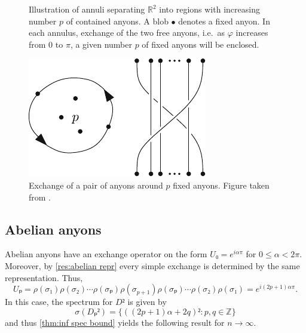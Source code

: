 \begin{figure}[h]
  \centering
  \caption{Illustration of annuli separating $ℝ^2$ into regions with increasing number $p$ of contained anyons. A blob $\bullet$ denotes a fixed anyon. In each annulus, exchange of the two free anyons, i.e.\ as $φ$ increases from $0$ to $π$, a given number $p$ of fixed anyons will be enclosed.}
  \label{fig:annuli}
\end{figure}

\begin{figure}[h]
  \centering
  \includegraphics{img/interchange_loop_p.pdf}
  \caption{Exchange of a pair of anyons around $p$ fixed anyons. Figure taken from \cite{lundholm-solovej}.}
  \label{fig:Up exchange}
\end{figure}








\subsection{Abelian anyons}

Abelian anyons have an exchange operator on the form $U₀ = e^{iαπ}$ for $0≤α<2π$. Moreover, by \cref{res:abelian repr} every simple exchange is determined by the same representation. Thus,
\begin{equation}
  Uₚ = ρ(σ₁)ρ(σ₂)⋯ρ(σₚ)ρ(σ_{p+1})ρ(σₚ)⋯ρ(σ₂)ρ(σ₁) = e^{i(2p+1)απ}.
\end{equation}
In this case, the spectrum for $D²$ is given by
\begin{equation}
  σ(Dₚ²) = \{ \left( (2p+1)α + 2q \right)² : p,q ∈ ℤ \}
\end{equation}
and thus \cref{thm:inf spec bound} yields the following result for $n → ∞$.

